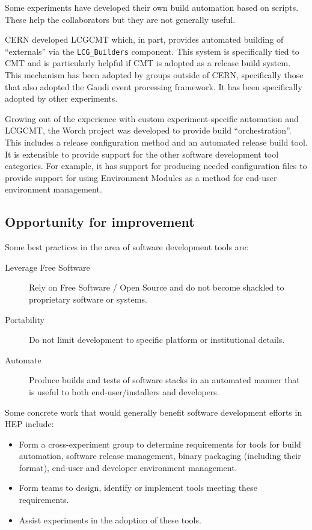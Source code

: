 Some experiments have developed their own build automation based on
scripts.  These help the collaborators but they are not generally
useful.

CERN developed LCGCMT which, in part, provides automated building of
``externals'' via the \verb|LCG_Builders| component.  This system is
specifically tied to CMT and is particularly helpful if CMT is adopted
as a release build system.  This mechanism has been adopted by groups
outside of CERN, specifically those that also adopted the Gaudi event
processing framework.  It has been specifically adopted by other
experiments.

Growing out of the experience with custom experiment-specific
automation and LCGCMT, the Worch project was developed to provide
build ``orchestration''.  This includes a release configuration method
and an automated release build tool.  It is extensible to provide
support for the other software development tool categories.  For
example, it has support for producing needed configuration files to
provide support for using Environment Modules as a method for end-user
environment management.


\subsection{Opportunity for improvement}

Some best practices in the area of software development tools are:

\begin{description}
\item[Leverage Free Software] Rely on Free Software / Open Source and
  do not become shackled to proprietary software or systems.
\item[Portability] Do not limit development to specific platform or
  institutional details.
\item[Automate] Produce builds and tests of software stacks in an
  automated manner that is useful to both end-user/installers and
  developers.
\end{description}

\noindent Some concrete work that would generally benefit software development efforts in HEP include:

\begin{itemize}
\item Form a cross-experiment group to determine requirements for
  tools for build automation, software release management, binary
  packaging (including their format), end-user and developer
  environment management.
\item Form teams to design, identify or implement tools meeting these
  requirements.
\item Assist experiments in the adoption of these tools.
\end{itemize}

